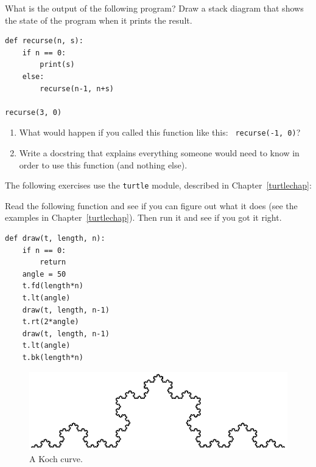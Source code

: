 \documentclass[10pt]{book}
\begin{document}
\begin{exercise}
What is the output of the following program?
Draw a stack diagram that shows the state of the program
when it prints the result.

\begin{verbatim}
def recurse(n, s):
    if n == 0:
        print(s)
    else:
        recurse(n-1, n+s)

recurse(3, 0)
\end{verbatim}

\begin{enumerate}

\item What would happen if you called this function like this: {\tt
  recurse(-1, 0)}?

\item Write a docstring that explains everything someone would need to
  know in order to use this function (and nothing else).

\end{enumerate}

\end{exercise}


The following exercises use the {\tt turtle} module, described in
Chapter~\ref{turtlechap}:

\begin{exercise}

Read the following function and see if you can figure out
what it does (see the examples in Chapter~\ref{turtlechap}).  Then run it 
and see if you got it right.

\begin{verbatim}
def draw(t, length, n):
    if n == 0:
        return
    angle = 50
    t.fd(length*n)
    t.lt(angle)
    draw(t, length, n-1)
    t.rt(2*angle)
    draw(t, length, n-1)
    t.lt(angle)
    t.bk(length*n)
\end{verbatim}

\end{exercise}


\begin{figure}
\centerline
{\includegraphics[scale=0.8]{figs/koch.pdf}}
\caption{A Koch curve.}
\label{fig.koch}
\end{figure}
\end{document}
